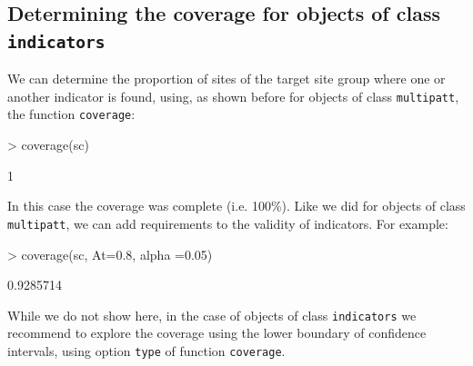 \documentclass[11pt,a4paper]{article}
\begin{document}
\subsection{Determining the coverage for objects of class \texttt{indicators}}
We can determine the proportion of sites of the target site group where one or another indicator is found, using, as shown before for objects of class \texttt{multipatt}, the function \texttt{coverage}:
\begin{Schunk}
\begin{Sinput}
> coverage(sc)
\end{Sinput}
\begin{Soutput}
[1] 1
\end{Soutput}
\end{Schunk}
In this case the coverage was complete (i.e. 100\%). Like we did for objects of class \texttt{multipatt}, we can add requirements to the validity of indicators. For example:
\begin{Schunk}
\begin{Sinput}
> coverage(sc, At=0.8, alpha =0.05)
\end{Sinput}
\begin{Soutput}
[1] 0.9285714
\end{Soutput}
\end{Schunk}
While we do not show here, in the case of objects of class \texttt{indicators} we recommend to explore the coverage using the lower boundary of confidence intervals, using option \texttt{type} of function \texttt{coverage}. 
\end{document}
